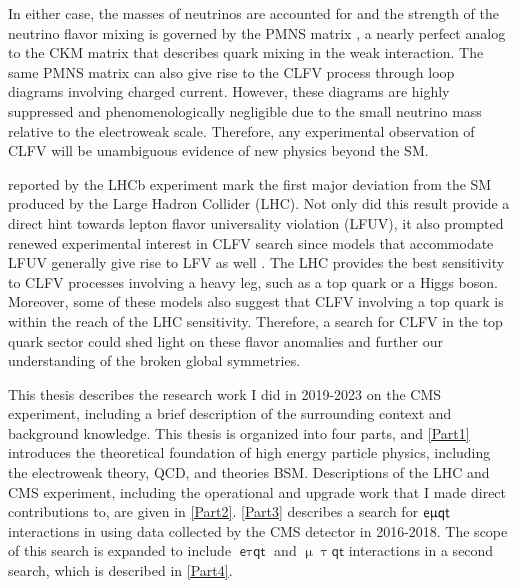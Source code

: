In either case, the masses of neutrinos are accounted for and the strength of the neutrino flavor mixing is governed by the PMNS matrix \cite{Pontecorvo:1957cp,Maki:1962mu}, a nearly perfect analog to the CKM matrix \cite{Cabibbo:1963yz,Kobayashi:1973fv} that describes quark mixing in the weak interaction. The same PMNS matrix can also give rise to the CLFV process through loop diagrams involving charged current. However, these diagrams are highly suppressed and phenomenologically negligible due to the small neutrino mass relative to the electroweak scale. Therefore, any experimental observation of CLFV will be unambiguous evidence of new physics beyond the SM.

reported by the LHCb experiment mark the first major deviation from the SM produced by the Large Hadron Collider (LHC). Not only did this result provide a direct hint towards lepton flavor universality violation (LFUV), it also prompted renewed experimental interest in CLFV search since models that accommodate LFUV generally give rise to LFV as well \cite{Glashow:2014iga}. The LHC provides the best sensitivity to CLFV processes involving a heavy leg, such as a top quark or a Higgs boson. Moreover, some of these models \cite{Kim:2018oih} also suggest that CLFV involving a top quark is within the reach of the LHC sensitivity. Therefore, a search for CLFV in the top quark sector could shed light on these flavor anomalies and further our understanding of the broken global symmetries.

This thesis describes the research work I did in 2019-2023 on the \ac{CMS} experiment, including a brief description of the surrounding context and background knowledge. This thesis is organized into four parts, and \autoref{Part1} introduces the theoretical foundation of high energy particle physics, including the electroweak theory, \ac{QCD}, and theories \ac{BSM}. Descriptions of the \ac{LHC} and {CMS} experiment, including the operational and upgrade work that I made direct contributions to, are given in \autoref{Part2}. \autoref{Part3} describes a search for $\textsf{e}\upmu\textsf{{q}t}$ interactions in using data collected by the \ac{CMS} detector in 2016-2018. The scope of this search is expanded to include $\textsf{e}\uptau\textsf{qt}$ and $\upmu\uptau\textsf{qt}$ interactions in a second search, which is described in \autoref{Part4}.




